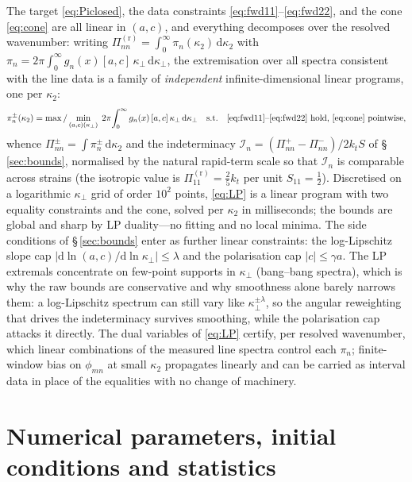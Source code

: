\documentclass[11pt,a4paper]{article}
\begin{document}
The target \eqref{eq:Piclosed}, the data constraints
\eqref{eq:fwd11}--\eqref{eq:fwd22}, and the cone \eqref{eq:cone} are all
linear in $(a,c)$, and everything decomposes over the resolved wavenumber:
writing $\Pi^{(\mathrm r)}_{nn}=\int_0^\infty
\pi_n(\kappa_2)\,\mathrm{d}\kappa_2$ with
$\pi_n=2\pi\int_0^\infty g_n(x)[a,c]\,\kappa_\perp\,\mathrm{d}\kappa_\perp$,
the extremisation over all spectra consistent with the line data is a
family of \emph{independent} infinite-dimensional linear programs, one per
$\kappa_2$:
\begin{equation}
  \pi_n^{\pm}(\kappa_2)
  = \max/\min_{(a,c)(\kappa_\perp)}\;
    2\pi\!\int_0^\infty g_n(x)\,[a,c]\,\kappa_\perp\,\mathrm{d}\kappa_\perp
  \quad\text{s.t.}\quad
  \text{\eqref{eq:fwd11}--\eqref{eq:fwd22} hold, \eqref{eq:cone}
  pointwise},
  \label{eq:LP}
\end{equation}
whence $\Pi^{\pm}_{nn}=\int\pi_n^{\pm}\,\mathrm{d}\kappa_2$ and the
indeterminacy $\mathcal I_n=(\Pi^{+}_{nn}-\Pi^{-}_{nn})/2k_tS$ of
\S\,\ref{sec:bounds}, normalised by the natural rapid-term scale so that
$\mathcal I_n$ is comparable across strains (the isotropic value is
$\Pi^{(\mathrm r)}_{11}=\tfrac25 k_t$ per unit $S_{11}=\tfrac12$).
Discretised on a logarithmic $\kappa_\perp$ grid of order $10^2$ points,
\eqref{eq:LP} is a linear program with two equality constraints and the
cone, solved per $\kappa_2$ in milliseconds; the bounds are global and
sharp by LP duality---no fitting and no local minima. The side conditions
of \S\,\ref{sec:bounds} enter as further linear constraints: the
log-Lipschitz slope cap
$|\mathrm{d}\ln(a,c)/\mathrm{d}\ln\kappa_\perp|\le\lambda$ and the
polarisation cap $|c|\le\gamma a$. The LP extremals concentrate on
few-point supports in $\kappa_\perp$ (bang--bang spectra), which is why
the raw bounds are conservative and why smoothness alone barely narrows
them: a log-Lipschitz spectrum can still vary like
$\kappa_\perp^{\pm\lambda}$, so the angular reweighting that drives the
indeterminacy survives smoothing, while the polarisation cap attacks it
directly. The dual variables of \eqref{eq:LP} certify, per resolved
wavenumber, which linear combinations of the measured line spectra control
each $\pi_n$; finite-window bias on $\phi_{mn}$ at small $\kappa_2$
propagates linearly and can be carried as interval data in place of the
equalities with no change of machinery.

\section{Numerical parameters, initial conditions and statistics}
\label{app:numerics}
\end{document}
